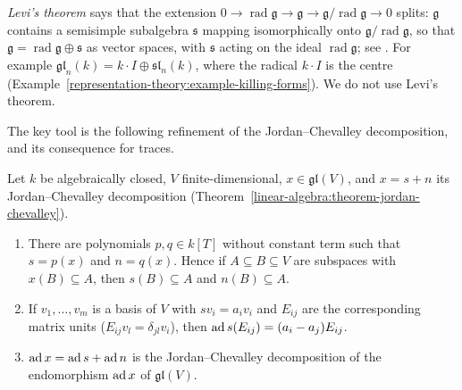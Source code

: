 \begin{remark}\label{representation-theory:remark-levi}
\emph{Levi's theorem} says that the extension $0 \to \operatorname{rad}\mathfrak{g} \to \mathfrak{g} \to \mathfrak{g}/\operatorname{rad}\mathfrak{g} \to 0$ splits: $\mathfrak{g}$
contains a semisimple subalgebra $\mathfrak{s}$ mapping isomorphically onto $\mathfrak{g}/\operatorname{rad}\mathfrak{g}$, so that $\mathfrak{g} = \operatorname{rad}\mathfrak{g}
\oplus \mathfrak{s}$ as vector spaces, with $\mathfrak{s}$ acting on the ideal $\operatorname{rad}\mathfrak{g}$; see \cite[Appendix E]{fulton-harris}. For example
$\mathfrak{gl}_n(k) = k\cdot I \oplus \mathfrak{sl}_n(k)$, where the radical $k \cdot I$ is the centre (Example~\ref{representation-theory:example-killing-forms}). We do not use
Levi's theorem.
\end{remark}

The key tool is the following refinement of the Jordan--Chevalley decomposition, and its consequence for traces.

\begin{lemma}\label{representation-theory:lemma-jordan-ad}
Let $k$ be algebraically closed, $V$ finite-dimensional, $x \in \mathfrak{gl}(V)$, and $x = s + n$ its Jordan--Chevalley decomposition
(Theorem~\ref{linear-algebra:theorem-jordan-chevalley}).
\begin{enumerate}
\item There are polynomials $p, q \in k[T]$ without constant term such that $s = p(x)$ and $n = q(x)$. Hence if $A \subseteq B \subseteq V$ are subspaces with
$x(B) \subseteq A$, then $s(B) \subseteq A$ and $n(B) \subseteq A$.
\item If $v_1, \ldots, v_m$ is a basis of $V$ with $sv_i = a_iv_i$ and $E_{ij}$ are the corresponding matrix units ($E_{ij}v_l = \delta_{jl}v_i$), then
$\operatorname{ad} s(E_{ij}) = (a_i - a_j)E_{ij}$.
\item $\operatorname{ad} x = \operatorname{ad} s + \operatorname{ad} n$ is the Jordan--Chevalley decomposition of the endomorphism $\operatorname{ad} x$ of $\mathfrak{gl}(V)$.
\end{enumerate}
\end{lemma}

